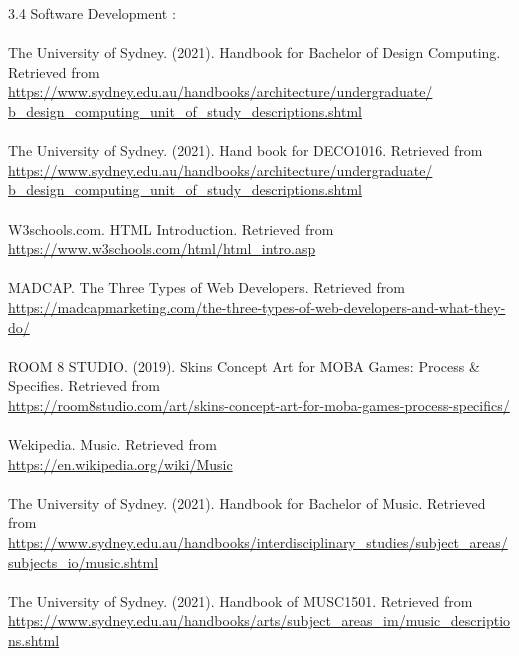\documentclass{article}
\begin{document}
	3.4 Software Development :\\
	\\
	The University of Sydney. (2021). Handbook for Bachelor of Design Computing. Retrieved from\\ \url{https://www.sydney.edu.au/handbooks/architecture/undergraduate/
	b_design_computing_unit_of_study_descriptions.shtml}\\
	\\
	The University of Sydney. (2021). Hand book for DECO1016. Retrieved from\\ \url{https://www.sydney.edu.au/handbooks/architecture/undergraduate/
	b_design_computing_unit_of_study_descriptions.shtml}\\
	\\
	W3schools.com. HTML Introduction. Retrieved from\\
    \url{https://www.w3schools.com/html/html_intro.asp}\\
    \\
    MADCAP. The Three Types of Web Developers. Retrieved from\\
    \url{https://madcapmarketing.com/the-three-types-of-web-developers-and-what-they-do/}\\
    \\
    ROOM 8 STUDIO. (2019). Skins Concept Art for MOBA Games: Process & Specifies. Retrieved from\\
    \url{https://room8studio.com/art/skins-concept-art-for-moba-games-process-specifics/}\\
    \\
    Wekipedia. Music. Retrieved from\\
    \url{https://en.wikipedia.org/wiki/Music}\\
    \\
    The University of Sydney. (2021). Handbook for Bachelor of Music. Retrieved from\\
    \url{https://www.sydney.edu.au/handbooks/interdisciplinary_studies/subject_areas/subjects_io/music.shtml}\\
    \\
    The University of Sydney. (2021). Handbook of MUSC1501. Retrieved from\\
    \url{https://www.sydney.edu.au/handbooks/arts/subject_areas_im/music_descriptions.shtml}\\
    \\
\end{document}
